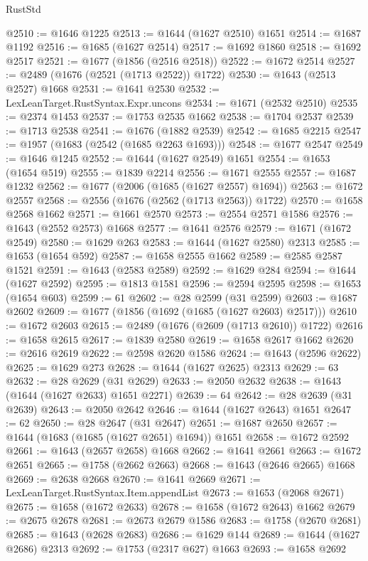 \begin{lexlean}{RustStd}
\begin{coremodule}
@2510 := @1646 @1225
@2513 := @1644 (@1627 @2510) @1651
@2514 := @1687 @1192
@2516 := @1685 (@1627 @2514)
@2517 := @1692 @1860
@2518 := @1692 @2517
@2521 := @1677 (@1856 (@2516 @2518))
@2522 := @1672 @2514
@2527 := @2489 (@1676 (@2521 (@1713 @2522)) @1722)
@2530 := @1643 (@2513 @2527) @1668
@2531 := @1641 @2530
@2532 := LexLeanTarget.RustSyntax.Expr.uncons
@2534 := @1671 (@2532 @2510)
@2535 := @2374 @1453
@2537 := @1753 @2535 @1662
@2538 := @1704 @2537
@2539 := @1713 @2538
@2541 := @1676 (@1882 @2539)
@2542 := @1685 @2215
@2547 := @1957 (@1683 (@2542 (@1685 @2263 @1693)))
@2548 := @1677 @2547
@2549 := @1646 @1245
@2552 := @1644 (@1627 @2549) @1651
@2554 := @1653 (@1654 @519)
@2555 := @1839 @2214
@2556 := @1671 @2555
@2557 := @1687 @1232
@2562 := @1677 (@2006 (@1685 (@1627 @2557) @1694))
@2563 := @1672 @2557
@2568 := @2556 (@1676 (@2562 (@1713 @2563)) @1722)
@2570 := @1658 @2568 @1662
@2571 := @1661 @2570
@2573 := @2554 @2571 @1586
@2576 := @1643 (@2552 @2573) @1668
@2577 := @1641 @2576
@2579 := @1671 (@1672 @2549)
@2580 := @1629 @263
@2583 := @1644 (@1627 @2580) @2313
@2585 := @1653 (@1654 @592)
@2587 := @1658 @2555 @1662
@2589 := @2585 @2587 @1521
@2591 := @1643 (@2583 @2589)
@2592 := @1629 @284
@2594 := @1644 (@1627 @2592)
@2595 := @1813 @1581
@2596 := @2594 @2595
@2598 := @1653 (@1654 @603)
@2599 := 61
@2602 := @28 @2599 (@31 @2599)
@2603 := @1687 @2602
@2609 := @1677 (@1856 (@1692 (@1685 (@1627 @2603) @2517)))
@2610 := @1672 @2603
@2615 := @2489 (@1676 (@2609 (@1713 @2610)) @1722)
@2616 := @1658 @2615
@2617 := @1839 @2580
@2619 := @1658 @2617 @1662
@2620 := @2616 @2619
@2622 := @2598 @2620 @1586
@2624 := @1643 (@2596 @2622)
@2625 := @1629 @273
@2628 := @1644 (@1627 @2625) @2313
@2629 := 63
@2632 := @28 @2629 (@31 @2629)
@2633 := @2050 @2632
@2638 := @1643 (@1644 (@1627 @2633) @1651 @2271)
@2639 := 64
@2642 := @28 @2639 (@31 @2639)
@2643 := @2050 @2642
@2646 := @1644 (@1627 @2643) @1651
@2647 := 62
@2650 := @28 @2647 (@31 @2647)
@2651 := @1687 @2650
@2657 := @1644 (@1683 (@1685 (@1627 @2651) @1694)) @1651
@2658 := @1672 @2592
@2661 := @1643 (@2657 @2658) @1668
@2662 := @1641 @2661
@2663 := @1672 @2651
@2665 := @1758 (@2662 @2663)
@2668 := @1643 (@2646 @2665) @1668
@2669 := @2638 @2668
@2670 := @1641 @2669
@2671 := LexLeanTarget.RustSyntax.Item.appendList
@2673 := @1653 (@2068 @2671)
@2675 := @1658 (@1672 @2633)
@2678 := @1658 (@1672 @2643) @1662
@2679 := @2675 @2678
@2681 := @2673 @2679 @1586
@2683 := @1758 (@2670 @2681)
@2685 := @1643 (@2628 @2683)
@2686 := @1629 @144
@2689 := @1644 (@1627 @2686) @2313
@2692 := @1753 (@2317 @627) @1663
@2693 := @1658 @2692

\end{coremodule}
\end{lexlean}
